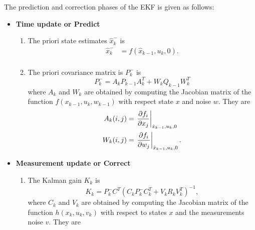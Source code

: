The prediction and correction phases of the EKF is given as follows:
\begin{itemize}
\item \textbf{Time update or Predict}
\begin{enumerate}
\item The priori state estimates $\hat x_k^{-}$ is
\begin{equation}
	\begin{split}
	\label{eq:ekf_priori}
	\hat{x}_k^- &= f(\hat{x}_{k-1},u_{k},0).\\
	\end{split}
\end{equation}
\item The priori covariance matrix is $P_k^-$ is
\begin{equation} P_k^- = A_kP_{k-1}A_k^T + W_kQ_{k-1}W_k^T \end{equation}
where $A_k$ and $W_k$ are obtained by computing the Jacobian matrix of the function $f(x_{k-1},u_k,w_{k-1})$ with respect state $x$ and noise $w$. They are
\begin{equation}
	\begin{split}
	A_k(i,j) &= \left. \frac{\partial {f_i}}{\partial {x_j}}\right \vert_{\hat{x}_{k-1},u_k,0}  \\
	W_k(i,j) &= \left. \frac{\partial {f_i}}{\partial {w_j}}\right \vert_{\hat{x}_{k-1},u_k,0}.
	\end{split}
\end{equation}
\end{enumerate}
\item \textbf{Measurement update or Correct} 
\begin{enumerate}
	\item The Kalman gain $K_k$ is 
		$$K_k = P_k^-C^T(C_kP_k^-C_k^T + V_kR_kV_k^T)^{-1},$$
		where $C_k$ and $V_k$ are obtained by computing the Jacobian matrix of the function $h(x_k,u_k,v_k)$ with respect to states $x$ and the measurements noise $v$. They are 

\end{enumerate}
\end{itemize}
